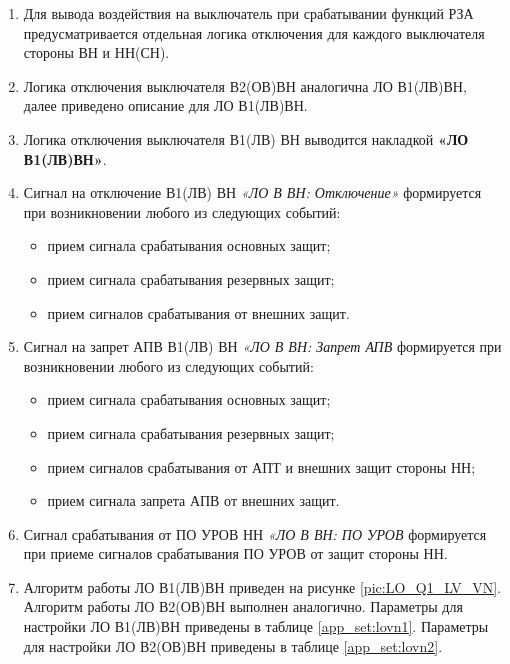 \color{black}

\begin{enumerate}

\item 
Для вывода воздействия на выключатель при срабатывании функций РЗА предусматривается отдельная логика отключения для каждого выключателя стороны ВН и НН(СН). 

\item
Логика отключения выключателя В2(ОВ)ВН аналогична ЛО В1(ЛВ)ВН, далее приведено описание для ЛО В1(ЛВ)ВН.

\item
Логика отключения выключателя В1(ЛВ) ВН выводится накладкой \textbf{«ЛО В1(ЛВ)ВН»}. 

\item
Сигнал на отключение В1(ЛВ) ВН \textit{«ЛО В ВН: Отключение»} формируется при возникновении любого из следующих событий:
\begin{itemize}
\item прием сигнала срабатывания основных защит;
\item прием сигнала срабатывания резервных защит;
\item прием сигналов срабатывания от внешних защит.
\end{itemize}

\item
Сигнал на запрет АПВ В1(ЛВ) ВН \textit{«ЛО В ВН: Запрет АПВ} формируется при возникновении любого из следующих событий:
\begin{itemize}
\item прием сигнала срабатывания основных защит;
\item прием сигнала срабатывания резервных защит;
\item прием сигналов срабатывания от АПТ и внешних защит стороны НН;
\item прием сигнала запрета АПВ от внешних защит.
\end{itemize}

\item
Сигнал срабатывания от ПО УРОВ НН \textit{«ЛО В ВН: ПО УРОВ} формируется при приеме сигналов срабатывания ПО УРОВ от защит стороны НН.

\item
Алгоритм работы ЛО В1(ЛВ)ВН приведен на рисунке \ref{pic:LO_Q1_LV_VN}. Алгоритм работы ЛО В2(ОВ)ВН выполнен аналогично. Параметры для настройки ЛО В1(ЛВ)ВН приведены в таблице \ref{app_set:lovn1}. Параметры для настройки ЛО В2(ОВ)ВН приведены в таблице \ref{app_set:lovn2}.


\end{enumerate}
